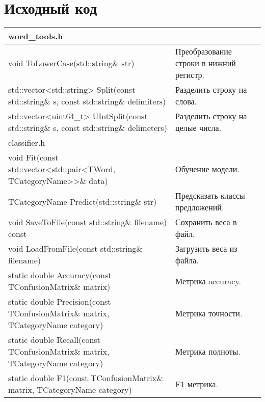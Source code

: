 \section{Исходный код}
\begin{longtable}{|p{7.5cm}|p{7.5cm}|}
\hline
\rowcolor{lightgray}
\multicolumn{2}{|c|} {word\_tools.h}\\
\hline
void ToLowerCase(std::string\& str)&Преобразование строки в нижний регистр.\\
\hline
std::vector<std::string> Split(const std::string\& s, const std::string\& delimiters)&Разделить строку на слова.\\
\hline
std::vector<uint64\_t> UIntSplit(const std::string\& s, const std::string\& delimeters)&Разделить строку на целые числа.\\
\hline
\rowcolor{lightgray}
\multicolumn{2}{|c|} {classifier.h}\\
\hline
void Fit(const std::vector<std::pair<TWord, TCategoryName>>\& data)&Обучение модели.\\
\hline
TCategoryName Predict(std::string\& str)&Предсказать классы предложений.\\
\hline
void SaveToFile(const std::string\& filename) const&Сохранить веса в файл.\\
\hline
void LoadFromFile(const std::string\& filename)&Загрузить веса из файла.\\
\hline
static double Accuracy(const TConfusionMatrix\& matrix)&Метрика accuracy.\\
\hline
static double Precision(const TConfusionMatrix\& matrix, TCategoryName category)&Метрика точности.\\
\hline
static double Recall(const TConfusionMatrix\& matrix, TCategoryName category)&Метрика полноты.\\
\hline
static double F1(const TConfusionMatrix\& matrix, TCategoryName category)&F1 метрика.\\
\hline
\end{longtable}

